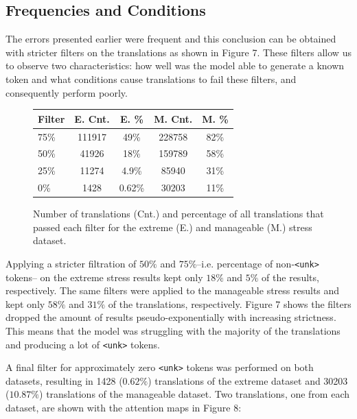 \documentclass[11pt,a4paper]{article}
\begin{document}
\subsection{Frequencies and Conditions}
The errors presented earlier were frequent and this conclusion can be obtained with stricter filters on the translations as shown in Figure 7. These filters allow us to observe two characteristics: how well was the model able to generate a known token and what conditions cause translations to fail these filters, and consequently perform poorly.
\begin{figure}[h]
    \centering
    \begin{tabular}{| l || c | c || c | c |}
    \hline
    Filter & E. Cnt. & E. \% & M. Cnt. & M. \%\\
    \hline
    \hline
    75\% & 111917 & 49\% & 228758 & 82\% \\
    50\% & 41926 & 18\% & 159789 & 58\%\\
    25\% & 11274 & 4.9\% & 85940 & 31\%\\
    0\% & 1428 & 0.62\% & 30203 & 11\%\\
    \hline
    \end{tabular}
    \caption{Number of translations (Cnt.) and percentage of all translations that passed each filter for the extreme (E.) and manageable (M.) stress dataset.}
\end{figure}

Applying a stricter filtration of $50\%$ and $75\%$--i.e. percentage of non-\verb|<unk>| tokens-- on the extreme stress results kept only $18\%$ and $5\%$ of the results, respectively. The same filters were applied to the manageable stress results and kept only $58\%$ and $31\%$ of the translations, respectively. Figure 7 shows the filters dropped the amount of results pseudo-exponentially with increasing strictness. This means that the model was struggling with the majority of the translations and producing a lot of \verb|<unk>| tokens.

A final filter for approximately zero \verb|<unk>| tokens was performed on both datasets, resulting in 1428 ($0.62\%$) translations of the extreme dataset and 30203 ($10.87\%$) translations of the manageable dataset. Two translations, one from each dataset, are shown with the attention maps in Figure 8:
\end{document}
